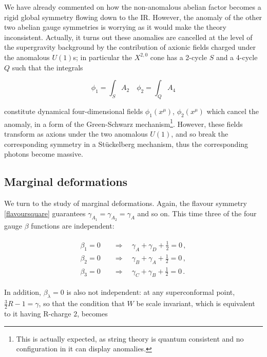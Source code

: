 We have already commented on how the non-anomalous abelian factor becomes a rigid global symmetry flowing down to the IR. However, the anomaly of the other two abelian gauge symmetries is worrying as it would make the theory inconsistent. Actually, it turns out these anomalies are cancelled at the level of the supergravity background by the contribution of axionic fields charged under the anomalous $U(1)$s; in particular the $X^{2,0}$ cone has a 2-cycle $S$ and a 4-cycle $Q$ such that the integrals

\begin{equation}
	\phi_1 = \int_S A_2 \quad \phi_2 = \int_Q A_4
	\label{}
\end{equation}

constitute dynamical four-dimensional fields $\phi_1(x^\mu)$, $\phi_2(x^\mu)$ which cancel the anomaly, in a form of the Green-Schwarz mechanism\footnote{This is actually expected, as string theory is quantum consistent and no configuration in it can display anomalies.}. However, these fields transform as axions under the two anomalous $U(1)$, and so break the corresponding symmetry in a St\"uckelberg mechanism, thus the corresponding photons become massive.

\subsection{Marginal deformations}

We turn to the study of marginal deformations. Again, the flavour symmetry \eqref{flavoursquare} guarantees $\gamma_{A_1} = \gamma_{A_2} = \gamma_A$ and so on. This time three of the four gauge $\beta$ functions are independent:

\begin{align}
	\begin{split}
\beta_1 = 0 \quad	& \Rightarrow  \quad	\gamma_A + \gamma_D + \frac{1}{2} = 0\,, \\
\beta_2 = 0 \quad	&  \Rightarrow	\quad	\gamma_B + \gamma_A + \frac{1}{2} = 0\,, \\
\beta_3 = 0 \quad	&  \Rightarrow	\quad	\gamma_C + \gamma_B + \frac{1}{2} = 0\,.
	\end{split}
\end{align}

In addition, $\beta_\lambda = 0$ is also not independent: at any superconformal point, $\frac{3}{2}R - 1 = \gamma$, so that the condition that $W$ be scale invariant, which is equivalent to it having R-charge $2$, becomes

